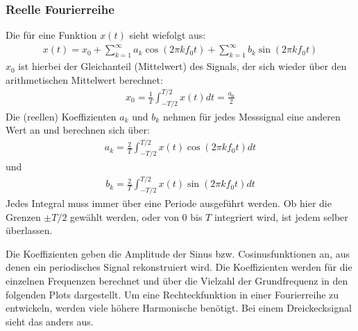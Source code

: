 \documentclass[letterpaper,10pt,english]{jupyterBook}
\begin{document}
\subsubsection{Reelle Fourierreihe}
\label{\detokenize{content/3_FourierAnalyse:reelle-fourierreihe}}
\sphinxAtStartPar
Die  für eine Funktion \(x(t)\) sieht wiefolgt aus:
\begin{equation*}
\begin{split}x(t) = x_0 + \sum_{k=1}^{\infty} a_k \cos(2\pi k f_0 t) + \sum_{k=1}^{\infty} b_k \sin(2\pi k f_0 t)\end{split}
\end{equation*}
\sphinxAtStartPar
\(x_0\) ist hierbei der Gleichanteil (Mittelwert) des Signals, der sich wieder über den arithmetischen Mittelwert berechnet:
\begin{equation*}
\begin{split}x_0 = \frac{1}{T} \int_{-T/2}^{T/2} x(t) dt = \frac{a_0}{2}\end{split}
\end{equation*}
\sphinxAtStartPar
Die (reellen) Koeffizienten \(a_k\) und \(b_k\) nehmen für jedes Messsignal eine anderen Wert an und berechnen sich über:
\begin{equation*}
\begin{split}a_k = \frac{2}{T}  \int_{-T/2}^{T/2} x(t) \cos(2\pi k f_0 t) dt \end{split}
\end{equation*}
\sphinxAtStartPar
und
\begin{equation*}
\begin{split}b_k = \frac{2}{T}  \int_{-T/2}^{T/2} x(t) \sin(2\pi k f_0 t) dt\end{split}
\end{equation*}
\sphinxAtStartPar
Jedes Integral muss immer über eine Periode ausgeführt werden. Ob hier die Grenzen \(\pm T/2\) gewählt werden, oder von \(0\) bis \(T\) integriert wird, ist jedem selber überlassen.

\sphinxAtStartPar
Die Koeffizienten geben die Amplitude der Sinus\sphinxhyphen{} bzw. Cosinusfunktionen an, aus denen ein periodisches Signal rekonstruiert wird. Die Koeffizienten werden für die einzelnen Frequenzen berechnet und über die Vielzahl der Grundfrequenz in den folgenden Plots dargestellt. Um eine Rechteckfunktion in einer Fourierreihe zu entwickeln, werden viele höhere Harmonische benötigt. Bei einem Dreickecksignal sieht das anders aus.
\end{document}
